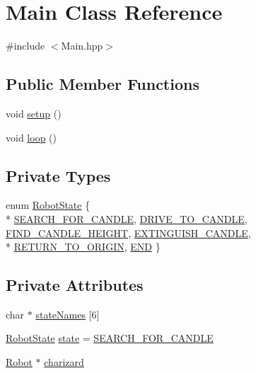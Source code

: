 \hypertarget{classMain}{\section{Main Class Reference}
\label{classMain}
}


{\ttfamily \#include $<$Main.\-hpp$>$}

\subsection*{Public Member Functions}
\begin{DoxyCompactItemize}
\item 
void \hyperlink{classMain_ab93af44e220d33016f01ed1b70612899}{setup} ()
\item 
void \hyperlink{classMain_ac061692135a219ec5b7a8211c4e26ed6}{loop} ()
\end{DoxyCompactItemize}
\subsection*{Private Types}
\begin{DoxyCompactItemize}
\item 
enum \hyperlink{classMain_a92ef9240246e98c3eb7cc8126982f98c}{Robot\-State} \{ \\*
\hyperlink{classMain_a92ef9240246e98c3eb7cc8126982f98ca9229c9e5dce20fda7fd5bbd54799fb32}{S\-E\-A\-R\-C\-H\-\_\-\-F\-O\-R\-\_\-\-C\-A\-N\-D\-L\-E}, 
\hyperlink{classMain_a92ef9240246e98c3eb7cc8126982f98ca548307ff4dd856e6420422153139c219}{D\-R\-I\-V\-E\-\_\-\-T\-O\-\_\-\-C\-A\-N\-D\-L\-E}, 
\hyperlink{classMain_a92ef9240246e98c3eb7cc8126982f98cab2b9975fcdb8d0d79230156c24adf5b4}{F\-I\-N\-D\-\_\-\-C\-A\-N\-D\-L\-E\-\_\-\-H\-E\-I\-G\-H\-T}, 
\hyperlink{classMain_a92ef9240246e98c3eb7cc8126982f98caf335b92cf0219a9b661613556bbe96b6}{E\-X\-T\-I\-N\-G\-U\-I\-S\-H\-\_\-\-C\-A\-N\-D\-L\-E}, 
\\*
\hyperlink{classMain_a92ef9240246e98c3eb7cc8126982f98ca3ff87a64146af251296a5ce0a05e923d}{R\-E\-T\-U\-R\-N\-\_\-\-T\-O\-\_\-\-O\-R\-I\-G\-I\-N}, 
\hyperlink{classMain_a92ef9240246e98c3eb7cc8126982f98ca6c2f5ff7b13123b1b782ac3664f20087}{E\-N\-D}
 \}
\end{DoxyCompactItemize}
\subsection*{Private Attributes}
\begin{DoxyCompactItemize}
\item 
char $\ast$ \hyperlink{classMain_a2b7c0a58d48668f3b54b50c2800edb68}{state\-Names} \mbox{[}6\mbox{]}
\item 
\hyperlink{classMain_a92ef9240246e98c3eb7cc8126982f98c}{Robot\-State} \hyperlink{classMain_a487b0fe523e37213256cf63f696b3bb0}{state} = \hyperlink{classMain_a92ef9240246e98c3eb7cc8126982f98ca9229c9e5dce20fda7fd5bbd54799fb32}{S\-E\-A\-R\-C\-H\-\_\-\-F\-O\-R\-\_\-\-C\-A\-N\-D\-L\-E}
\item 
\hyperlink{classRobot}{Robot} $\ast$ \hyperlink{classMain_a6b8534d72e39e2b43c3d46f2ca6e49f4}{charizard}
\end{DoxyCompactItemize}


